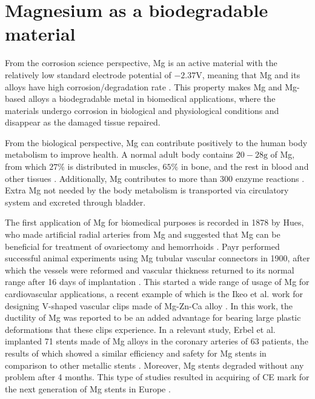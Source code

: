 \section{Magnesium as a biodegradable material}

From the corrosion science perspective, Mg is an active material with the relatively low standard electrode potential of $-2.37\text{V}$, meaning that Mg and its alloys have high corrosion/degradation rate \cite{Gao2022}. This property makes Mg and Mg-based alloys a biodegradable metal in biomedical applications, where the materials undergo corrosion in biological and physiological conditions and disappear as the damaged tissue repaired. 

From the biological perspective, Mg can contribute positively to the human body metabolism to improve health. A normal adult body contains $20-28\text{g}$ of Mg, from which $27\%$ is distributed in muscles, $65\%$ in bone, and the rest in blood and other tissues \cite{Vormann2003}. Additionally, Mg contributes to more than 300 enzyme reactions \cite{Elin1988}. Extra Mg not needed by the body metabolism is transported via circulatory system and excreted through bladder. 

The first application of Mg for biomedical purposes is recorded in 1878 by Hues, who made artificial radial arteries from Mg and suggested that Mg can be beneficial for treatment of ovariectomy and hemorrhoids \cite{huse1878new}. Payr performed successful animal experiments using Mg tubular vascular connectors in 1900, after which the vessels were reformed and vascular thickness returned to its normal range after 16 days of implantation \cite{Witte2010}. This started a wide range of usage of Mg for cardiovascular applications, a recent example of which is the Ikeo et al. work for designing V-shaped vascular clips made of Mg-Zn-Ca alloy \cite{Ikeo2016}. In this work, the ductility of Mg was reported to be an added advantage for bearing large plastic deformations that these clips experience. In a relevant study, Erbel et al. implanted 71 stents made of Mg alloys in the coronary arteries of 63 patients, the results of which showed a similar efficiency and safety for Mg stents in comparison to other metallic stents \cite{Erbel2007}. Moreover, Mg stents degraded without any problem after 4 months. This type of studies resulted in acquiring of CE mark for the next generation of Mg stents in Europe \cite{Sotomi2017,GarciaGarcia2018}.

